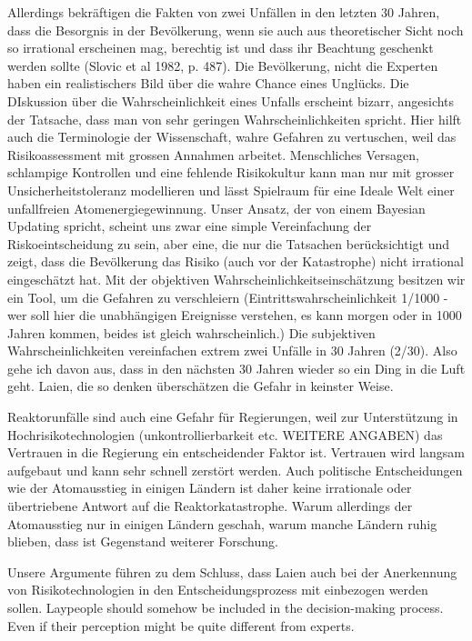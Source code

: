 Allerdings bekräftigen die Fakten von zwei Unfällen in den letzten 30 Jahren, dass die Besorgnis in der Bevölkerung, wenn sie auch aus theoretischer Sicht noch so irrational erscheinen mag, berechtig ist und dass ihr Beachtung geschenkt werden sollte (Slovic et al 1982, p. 487). Die Bevölkerung, nicht die Experten haben ein realistischers Bild über die wahre Chance eines Unglücks. 
Die DIskussion über die Wahrscheinlichkeit eines Unfalls erscheint bizarr, angesichts der Tatsache, dass man von sehr geringen Wahrscheinlichkeiten spricht. Hier hilft auch die Terminologie der Wissenschaft, wahre Gefahren zu vertuschen, weil das Risikoassessment mit grossen Annahmen arbeitet. Menschliches Versagen, schlampige Kontrollen und eine fehlende Risikokultur kann man nur mit grosser Unsicherheitstoleranz modellieren und lässt Spielraum für eine Ideale Welt einer unfallfreien Atomenergiegewinnung. Unser Ansatz, der von einem Bayesian Updating spricht, scheint uns zwar eine simple Vereinfachung der Riskoeintscheidung zu sein, aber eine, die nur die Tatsachen berücksichtigt und zeigt, dass die Bevölkerung das Risiko (auch vor der Katastrophe) nicht irrational eingeschätzt hat. Mit der objektiven Wahrscheinlichkeitseinschätzung besitzen wir ein Tool, um die Gefahren zu verschleiern (Eintrittswahrscheinlichkeit 1/1000 - wer soll hier die unabhängigen Ereignisse verstehen, es kann morgen oder in 1000 Jahren kommen, beides ist gleich wahrscheinlich.) Die subjektiven Wahrscheinlichkeiten vereinfachen extrem zwei Unfälle in 30 Jahren (2/30). Also gehe ich davon aus, dass in den nächsten 30 Jahren wieder so ein Ding in die Luft geht. Laien, die so denken überschätzen die Gefahr in keinster Weise. 

Reaktorunfälle sind auch eine Gefahr für Regierungen, weil zur Unterstützung in Hochrisikotechnologien (unkontrollierbarkeit etc. WEITERE ANGABEN) das Vertrauen in die Regierung ein entscheidender Faktor ist. Vertrauen wird langsam aufgebaut und kann sehr schnell zerstört werden. Auch politische Entscheidungen wie der Atomausstieg in einigen Ländern ist daher keine irrationale oder übertriebene Antwort auf die Reaktorkatastrophe. Warum allerdings der Atomausstieg nur in einigen Ländern geschah, warum manche Ländern ruhig blieben, dass ist Gegenstand weiterer Forschung.  

Unsere Argumente führen zu dem Schluss, dass Laien auch bei der Anerkennung von Risikotechnologien in den Entscheidungsprozess mit einbezogen werden sollen. Laypeople should somehow be included in the decision-making process. Even if their perception might be quite different from experts. 

